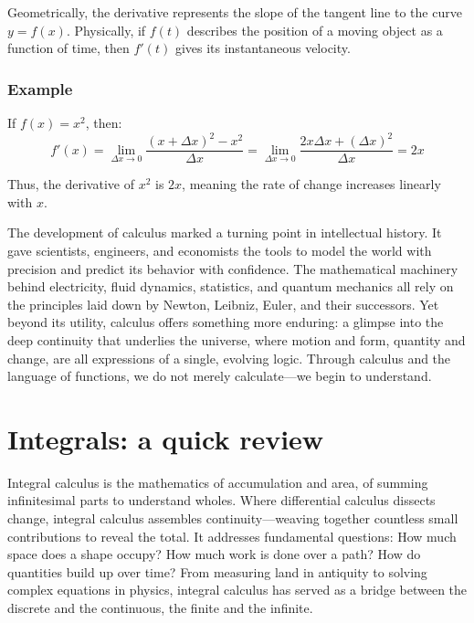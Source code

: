\documentclass{book}
\begin{document}
Geometrically, the derivative represents the slope of the tangent line to the curve \( y = f(x) \). Physically, if \( f(t) \) describes the position of a moving object as a function of time, then \( f'(t) \) gives its instantaneous velocity.

\subsection*{Example}

If \( f(x) = x^2 \), then:
\[
f'(x) = \lim_{\Delta x \to 0} \frac{(x + \Delta x)^2 - x^2}{\Delta x}
= \lim_{\Delta x \to 0} \frac{2x\Delta x + (\Delta x)^2}{\Delta x}
= 2x
\]

Thus, the derivative of \( x^2 \) is \( 2x \), meaning the rate of change increases linearly with \( x \).

The development of calculus marked a turning point in intellectual history. It gave scientists, engineers, and economists the tools to model the world with precision and predict its behavior with confidence. The mathematical machinery behind electricity, fluid dynamics, statistics, and quantum mechanics all rely on the principles laid down by Newton, Leibniz, Euler, and their successors. Yet beyond its utility, calculus offers something more enduring: a glimpse into the deep continuity that underlies the universe, where motion and form, quantity and change, are all expressions of a single, evolving logic. Through calculus and the language of functions, we do not merely calculate---we begin to understand.\\



\chapter{Integrals: a quick review}

Integral calculus is the mathematics of accumulation and area, of summing infinitesimal parts to understand wholes. Where differential calculus dissects change, integral calculus assembles continuity---weaving together countless small contributions to reveal the total. It addresses fundamental questions: How much space does a shape occupy? How much work is done over a path? How do quantities build up over time? From measuring land in antiquity to solving complex equations in physics, integral calculus has served as a bridge between the discrete and the continuous, the finite and the infinite.\\
\end{document}
